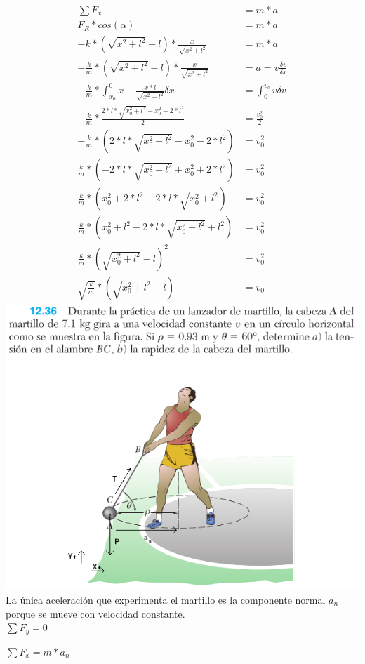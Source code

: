 \documentclass[12pt,fleqn]{article}
\begin{document}
\begin{align*}
  \sum{F_x}&=m*a\\
  F_R*cos(\alpha)&=m*a\\
  -k*(\sqrt{x^2+l^2}-l)*\frac{x}{\sqrt{x^2+l^2}}&=m*a\\
  -\frac{k}{m}*(\sqrt{x^2+l^2}-l)*\frac{x}{\sqrt{x^2+l^2}}&=a=v\frac{\delta v}{\delta x}\\
  -\frac{k}{m}*\int_{x_0}^0x-\frac{x*l}{\sqrt{x^2+l^2}}\delta x&=\int_0^{v_c}v\delta v\\
  -\frac{k}{m}*\frac{2*l*\sqrt{x_0^2+l^2}-x_0^2-2*l^2}{2}&=\frac{v_0^2}{2}\\
  -\frac{k}{m}*(2*l*\sqrt{x_0^2+l^2}-x_0^2-2*l^2)&=v_0^2\\
  \frac{k}{m}*(-2*l*\sqrt{x_0^2+l^2}+x_0^2+2*l^2)&=v_0^2\\
  \frac{k}{m}*(x_0^2+2*l^2-2*l*\sqrt{x_0^2+l^2})&=v_0^2\\
  \frac{k}{m}*(x_0^2+l^2-2*l*\sqrt{x_0^2+l^2}+l^2)&=v_0^2\\
  \frac{k}{m}*(\sqrt{x_0^2+l^2}-l)^2&=v_0^2\\
  \sqrt{\frac{k}{m}}*(\sqrt{x_0^2+l^2}-l)&=v_0
\end{align*}
\newpage
\includegraphics[width=\linewidth]{12.36}
\newpage
La única aceleración que experimenta el martillo es la componente normal $a_n$ porque se mueve con velocidad constante.\\

$\sum{F_y}=0$

$\sum{F_x}=m*a_n$
\end{document}
